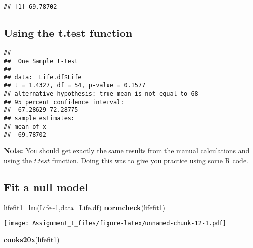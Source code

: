 \documentclass[
]{article}
\newenvironment{Shaded}{\begin{snugshade}}{\end{snugshade}}
\newcommand{\AttributeTok}[1]{\textcolor[rgb]{0.13,0.29,0.53}{#1}}
\newcommand{\DecValTok}[1]{\textcolor[rgb]{0.00,0.00,0.81}{#1}}
\newcommand{\FunctionTok}[1]{\textcolor[rgb]{0.13,0.29,0.53}{\textbf{#1}}}
\newcommand{\NormalTok}[1]{#1}
\newcommand{\OtherTok}[1]{\textcolor[rgb]{0.56,0.35,0.01}{#1}}
\newcommand{\SpecialCharTok}[1]{\textcolor[rgb]{0.81,0.36,0.00}{\textbf{#1}}}
\begin{document}
\begin{verbatim}
## [1] 69.78702
\end{verbatim}

\subsection{Using the t.test function}\label{using-the-t.test-function}

\begin{Shaded}
\end{Shaded}

\begin{verbatim}
## 
##  One Sample t-test
## 
## data:  Life.df$Life
## t = 1.4327, df = 54, p-value = 0.1577
## alternative hypothesis: true mean is not equal to 68
## 95 percent confidence interval:
##  67.28629 72.28775
## sample estimates:
## mean of x 
##  69.78702
\end{verbatim}

\textbf{Note:} You should get exactly the same results from the manual
calculations and using the \(t.test\) function. Doing this was to give
you practice using some R code.

\subsection{Fit a null model}\label{fit-a-null-model}

\begin{Shaded}
\begin{Highlighting}[]
\NormalTok{lifefit1}\OtherTok{=}\FunctionTok{lm}\NormalTok{(Life}\SpecialCharTok{\textasciitilde{}}\DecValTok{1}\NormalTok{,}\AttributeTok{data=}\NormalTok{Life.df)}
\FunctionTok{normcheck}\NormalTok{(lifefit1)}
\end{Highlighting}
\end{Shaded}

\texttt{[image: Assignment\_1\_files/figure-latex/unnamed-chunk-12-1.pdf]}

\begin{Shaded}
\begin{Highlighting}[]
\FunctionTok{cooks20x}\NormalTok{(lifefit1)}
\end{Highlighting}
\end{Shaded}
\end{document}
